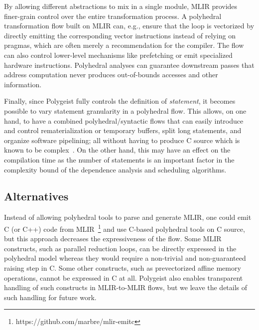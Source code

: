 \documentclass[sigplan]{acmart}
\newcommand{\tool}{Polygeist\xspace}
\begin{document}
By allowing different abstractions to mix in a single module, MLIR provides finer-grain control over the entire transformation process.
A polyhedral transformation flow built on MLIR can, e.g., ensure that the loop is vectorized by directly emitting the corresponding vector instructions instead of relying on pragmas, which are often merely a recommendation for the compiler. The flow can also control lower-level mechanisms like prefetching or emit specialized hardware instructions.
Polyhedral analyses can guarantee downstream passes that address computation never produces out-of-bounds accesses and other information.


Finally, since \tool fully controls the definition of \emph{statement}, it becomes possible to vary statement granularity in a polyhedral flow. This allows, on one hand, to have a combined polyhedral/syntactic flows that can easily introduce and control rematerialization or temporary buffers, split long statements, and organize software pipelining; all without having to produce C source which is known to be complex~\cite{csmith}. On the other hand, this may have an effect on the compilation time as the number of statements is an important factor in the complexity bound of the dependence analysis and scheduling algorithms.

\subsection{Alternatives}
Instead of allowing polyhedral tools to parse and generate MLIR, one could emit C (or C++) code from MLIR~\footnote{https://github.com/marbre/mlir-emitc} and use C-based polyhedral tools on C source, but this approach decreases the expressiveness of the flow. Some MLIR constructs, such as parallel reduction loops, can be directly expressed in the polyhedral model whereas they would require a non-trivial and non-guaranteed raising step in C. Some other constructs, such as prevectorized affine memory operations, cannot be expressed in C at all. \tool also enables transparent handling of such constructs in MLIR-to-MLIR flows, but we leave the details of such handling for future work.
\end{document}
